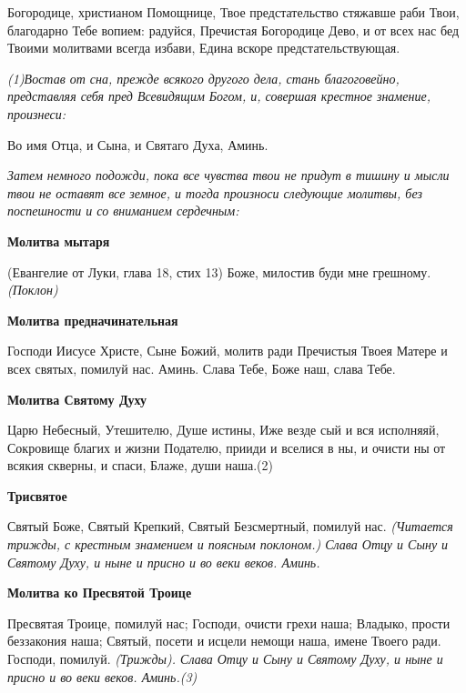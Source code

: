 Богородице, христианом Помощнице, Твое предстательство стяжавше раби Твои, благодарно Тебе вопием: радуйся, Пречистая Богородице Дево, и от всех нас бед Твоими молитвами всегда избави, Едина вскоре предстательствующая.
\mychapterending

 
\itshape (1)Востав от сна, прежде всякого другого дела, стань благоговейно, представляя себя пред Всевидящим Богом, и, совершая крестное знамение, произнеси:\normalfont{}


\medskip
Во имя Отца, и Сына, и Святаго Духа, Аминь.




\medskip
\itshape Затем немного подожди, пока все чувства твои не придут в тишину и мысли твои не оставят все земное, и тогда произноси следующие молитвы, без поспешности и со вниманием сердечным:\normalfont{}


\medskip


\bfseries Молитва мытаря\normalfont{}\itshape 


(Евангелие от Луки, глава 18, стих 13) 
\normalfont{}
Боже, милостив буди мне грешному. \itshape (Поклон)\normalfont{}


\medskip
\bfseries Молитва предначинательная\normalfont{}\nopagebreak


Господи Иисусе Христе, Сыне Божий, молитв ради Пречистыя Твоея Матере и всех святых, помилуй нас. Аминь.
Слава Тебе, Боже наш, слава Тебе.




\medskip
\bfseries Молитва Святому Духу\normalfont{}\nopagebreak


Царю Небесный, Утешителю, Душе истины, Иже везде сый и вся исполняяй, Сокровище благих и жизни Подателю, прииди и вселися в ны, и очисти ны от всякия скверны, и спаси, Блаже, души наша.(2) 


\medskip
\bfseries Трисвятое\normalfont{}\nopagebreak


Святый Боже, Святый Крепкий, Святый Безсмертный, помилуй нас. \itshape (Читается трижды, с крестным знамением и поясным поклоном.) \normalfont{}
Слава Отцу и Сыну и Святому Духу, и ныне и присно и во веки веков. Аминь.




\medskip
\bfseries Молитва ко Пресвятой Троице\normalfont{}\nopagebreak


Пресвятая Троице, помилуй нас; Господи, очисти грехи наша; Владыко, прости беззакония наша; Святый, посети и исцели немощи наша, имене Твоего ради.
Господи, помилуй. \itshape (Трижды)\normalfont{}. Слава Отцу и Сыну и Святому Духу, и ныне и присно и во веки веков. Аминь.\itshape (3)\normalfont{}



